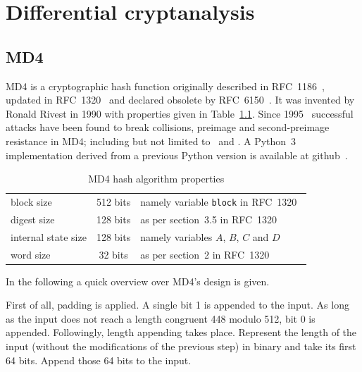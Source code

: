 \renewcommand*\chappic{img/diff-crypt.pdf}
\renewcommand*\chapquote{Just because it's automatic doesn't mean it works.}
\renewcommand*\chapquotesrc{Daniel J. Bernstein}
\chapter{Differential cryptanalysis}
\label{ch:dc}
%
\section{MD4}
\label{sec:dc-md4}
%
MD4 is a cryptographic hash function originally described in RFC~1186~\cite{rfc1186},
updated in RFC~1320~\cite{rfc1320} and declared obsolete by RFC~6150~\cite{rfc6150}. It was
invented by Ronald Rivest in 1990 with properties given in Table~\ref{tab:md4}.
Since 1995~\cite{Dobbertin1998} successful attacks have been found to break collisions,
preimage and second-preimage resistance in MD4; including but not limited to~\cite{md4-2007} and
\cite{cryptoeprint:2005:151}. A Python~3 implementation derived from a previous Python version
is available at github~\cite{md4-py3k}.

\begin{table}[h]
  \begin{center}
    \begin{tabular}{lcl}
      block size           & 512 bits       & namely variable \texttt{block} in RFC~1320~\cite{rfc1320} \\
      digest size          & 128 bits       & as per section~3.5 in RFC~1320~\cite{rfc1320} \\
      internal state size  & 128 bits       & namely variables $A$, $B$, $C$ and $D$ \\
      word size            & 32 bits        & as per section~2 in RFC~1320~\cite{rfc1320} \\
    \end{tabular}
    \caption{MD4 hash algorithm properties}
    \label{tab:md4}
  \end{center}
\end{table}

In the following a quick overview over MD4's design is given.

First of all, padding is applied. A single bit 1 is appended to the
input. As long as the input does not reach a length congruent 448 modulo 512,
bit 0 is appended.
Followingly, length appending takes place. Represent the length of the input
(without the modifications of the previous step) in binary and take its first
64 bits. Append those 64 bits to the input.

